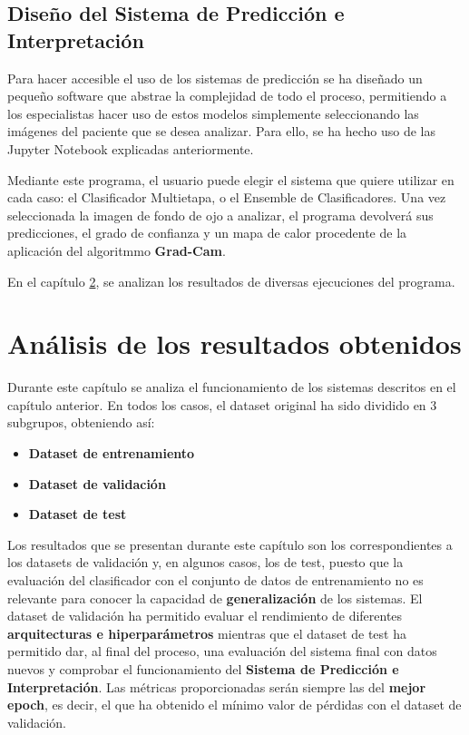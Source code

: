 \documentclass[
  12pt,
  spanish,
  a4paperpaper,
]{report}
\providecommand{\tightlist}{%
  \setlength{\itemsep}{0pt}\setlength{\parskip}{0pt}}
\begin{document}
\hypertarget{diseuxf1o-del-sistema-de-predicciuxf3n-e-interpretaciuxf3n}{%
\section{Diseño del Sistema de Predicción e
Interpretación}\label{diseuxf1o-del-sistema-de-predicciuxf3n-e-interpretaciuxf3n}}

Para hacer accesible el uso de los sistemas de predicción se ha diseñado
un pequeño software que abstrae la complejidad de todo el proceso,
permitiendo a los especialistas hacer uso de estos modelos simplemente
seleccionando las imágenes del paciente que se desea analizar. Para
ello, se ha hecho uso de las Jupyter Notebook explicadas anteriormente.

Mediante este programa, el usuario puede elegir el sistema que quiere
utilizar en cada caso: el Clasificador Multietapa, o el Ensemble de
Clasificadores. Una vez seleccionada la imagen de fondo de ojo a
analizar, el programa devolverá sus predicciones, el grado de confianza
y un mapa de calor procedente de la aplicación del algoritmmo
\textbf{Grad-Cam}.

En el capítulo \ref{resultados}, se analizan los resultados de diversas
ejecuciones del programa.

\hypertarget{resultados}{%
\chapter{Análisis de los resultados obtenidos}\label{resultados}}

Durante este capítulo se analiza el funcionamiento de los sistemas
descritos en el capítulo anterior. En todos los casos, el dataset
original ha sido dividido en 3 subgrupos, obteniendo así:

\begin{itemize}
\tightlist
\item
  \textbf{Dataset de entrenamiento}
\item
  \textbf{Dataset de validación}
\item
  \textbf{Dataset de test}
\end{itemize}

Los resultados que se presentan durante este capítulo son los
correspondientes a los datasets de validación y, en algunos casos, los
de test, puesto que la evaluación del clasificador con el conjunto de
datos de entrenamiento no es relevante para conocer la capacidad de
\textbf{generalización} de los sistemas. El dataset de validación ha
permitido evaluar el rendimiento de diferentes \textbf{arquitecturas e
hiperparámetros} mientras que el dataset de test ha permitido dar, al
final del proceso, una evaluación del sistema final con datos nuevos y
comprobar el funcionamiento del \textbf{Sistema de Predicción e
Interpretación}. Las métricas proporcionadas serán siempre las del
\textbf{mejor epoch}, es decir, el que ha obtenido el mínimo valor de
pérdidas con el dataset de validación.
\end{document}
